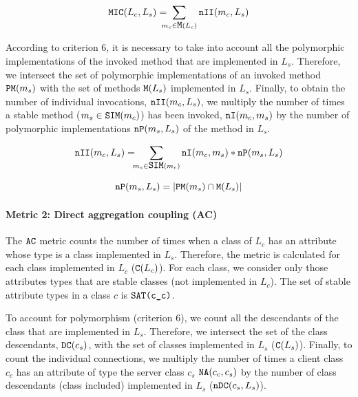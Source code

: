 \begin{equation*}
\verb|MIC|(L_c, L_s) =\!\!\!\!\! \sum_{m_c \in \verb|M|(L_c)} \verb|nII|(m_c, L_s)
\end{equation*}

According to criterion 6, it is necessary to take into account all the polymorphic implementations of the invoked method that are implemented in $L_s$. Therefore, we intersect the set of polymorphic implementations of an invoked method $\verb|PM|(m_s)$ with the set of methods $\verb|M|(L_s)$ implemented in $L_s$. Finally, to obtain the number of individual invocations, $\verb|nII|(m_c,L_s)$, we multiply the number of times a stable method ($m_s \in \verb|SIM|(m_c)$) has been invoked, $\verb|nI|(m_c, m_s)$ by the number of polymorphic implementations $\verb|nP|(m_s, L_s)$ of the method in $L_s$.

\begin{equation*}
   \verb|nII|(m_c, L_s) =\!\!\! \sum_{m_s \in \verb|SIM|(m_c)} \verb|nI|(m_c, m_s)*\verb|nP|(m_s, L_s)
\end{equation*}

\begin{equation*}
    \verb|nP|(m_s, L_s) = |\verb|PM|(m_s) \cap \verb|M|(L_s)|
\end{equation*}

\paragraph{Metric 2: Direct aggregation coupling (AC)}
The $\verb|AC|$ metric counts the number of times when a class of $L_c$ has an attribute whose type is a class implemented in $L_s$. Therefore, the metric is calculated for each class implemented in $L_c$ ($\verb|C|(L_c)$). For each class, we consider only those attributes types that are stable classes (not implemented in $L_c$). The set of stable attribute types in a class $c$ %
is $\verb|SAT(c_c)|$.

To account for polymorphism (criterion 6), we count all the descendants of the class that are implemented in $L_s$. Therefore, we intersect the set %
of the class descendants, $\verb|DC|(c_s)$, with the set of
classes implemented in $L_s$ ($\verb|C|(L_s)$). Finally, to count the  individual connections, we multiply the number of times a client class $c_c$ has an attribute of type the server class $c_s$ $\verb|NA|(c_c, c_s)$ by the number of class descendants (class included) implemented in $L_s$ ($\verb|nDC|(c_s,L_s)$).

